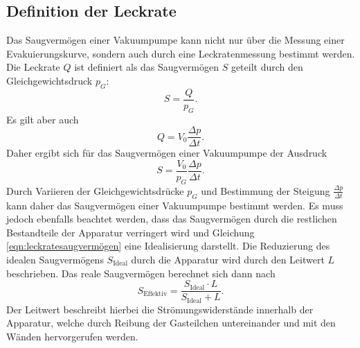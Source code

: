 \subsection{Definition der Leckrate}
\label{subsec:leckratetheorie}
Das Saugvermögen einer Vakuumpumpe kann nicht nur über die Messung einer Evakuierungskurve, sondern auch
durch eine Leckratenmessung bestimmt werden. Die Leckrate $Q$ ist definiert als das Saugvermögen $S$ geteilt durch
den Gleichgewichtsdruck $p_{G}$:
\begin{equation}
 S = \frac{Q}{p_{G}}.
\end{equation}
Es gilt aber auch
\begin{equation}
 Q = V_{0} \frac{\Delta p}{\Delta t}.
\end{equation}
Daher ergibt sich für das Saugvermögen einer Vakuumpumpe der Ausdruck
\begin{equation}
 S = \frac{V_{0}}{p_{G}} \frac{\Delta p}{\Delta t}.
 \label{eqn:leckratesaugvermögen}
\end{equation}
Durch Variieren der Gleichgewichtsdrücke $p_{G}$ und Bestimmung der Steigung $\frac{\Delta p}{\Delta t}$
kann daher das Saugvermögen einer Vakuumpumpe bestimmt werden. Es muss jedoch ebenfalls beachtet
werden, dass das Saugvermögen durch die restlichen Bestandteile der Apparatur verringert wird und
Gleichung \ref{eqn:leckratesaugvermögen} eine Idealisierung darstellt. Die Reduzierung des idealen
Saugvermögens $S_{\text{Ideal}}$ durch die Apparatur wird durch den Leitwert $L$ beschrieben. Das reale Saugvermögen
berechnet sich dann nach
\begin{equation}
 S_{\text{Effektiv}} = \frac{S_{\text{Ideal}} \cdot L}{S_{\text{Ideal}} + L}.
 \label{eqn:saugvermögenleitwert}
\end{equation}
Der Leitwert beschreibt hierbei die Strömungswiderstände innerhalb der Apparatur, welche durch Reibung der
Gasteilchen untereinander und mit den Wänden hervorgerufen werden.

